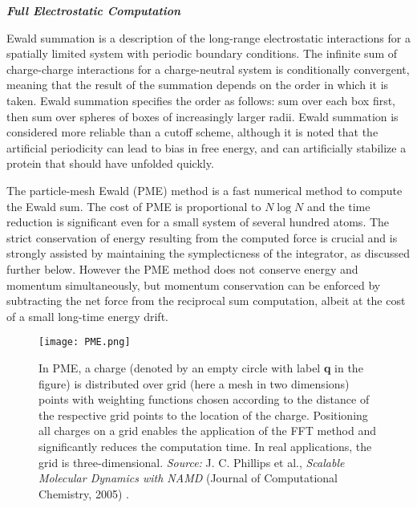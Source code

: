 \vspace{0.25cm}

\begin{center}
{\textbf{\textit{Full Electrostatic Computation}}}
\end{center}
Ewald summation is a description of the long-range electrostatic interactions for a spatially limited system with periodic boundary conditions. The infinite sum of charge-charge interactions for a charge-neutral system is conditionally convergent, meaning that the result of the summation depends on the order in which it is taken. Ewald summation specifies the order as follows: sum over each box first, then sum over spheres of boxes of increasingly larger radii. Ewald summation is considered more reliable than a cutoff scheme, although it is noted that the artificial periodicity can lead to bias in free energy, and can artificially stabilize a protein that should have unfolded quickly.

The particle-mesh Ewald (PME) method is a fast numerical method to compute the Ewald sum. The cost of PME is proportional to $N \log N$ and the time reduction is significant even for a small system of several hundred atoms. 
The strict conservation of energy resulting from the computed force is crucial and is strongly assisted by maintaining the symplecticness of the integrator, as discussed further below.
However the PME method does not conserve energy and momentum simultaneously, but momentum conservation can be enforced by subtracting the net force from the reciprocal sum computation, albeit at the cost of a small long-time energy drift.

\begin{figure}[H]
\centering
\begin{minipage}[t]{0.8\textwidth}
	\centering
    \texttt{[image: PME.png]}
    
    \footnotesize{\caption{In PME, a charge (denoted by an empty circle with label \textbf{q} in the figure) is distributed over grid (here a mesh in two dimensions) points with weighting functions chosen according to the distance of the respective grid points to the location of the charge. Positioning all charges on a grid enables the application of the FFT method and significantly reduces the computation time. In real applications, the grid is three-dimensional.
    \textit{Source:} J. C. Phillips et al., \textit{Scalable Molecular Dynamics with NAMD} (Journal of Computational Chemistry, 2005) 
    \cite{ref:NAMD}.}
    \label{fig:PME}
    }
\end{minipage} 
\end{figure}

